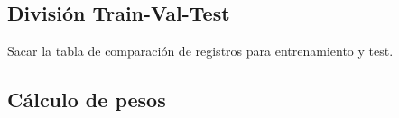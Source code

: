 \documentclass{uathesis-es}
\begin{document}
{	
	\subsection{División Train-Val-Test}
	
	Sacar la tabla de comparación de registros para entrenamiento y test.
	
	\subsection{Cálculo de pesos}
	
	
	
}
\end{document}
